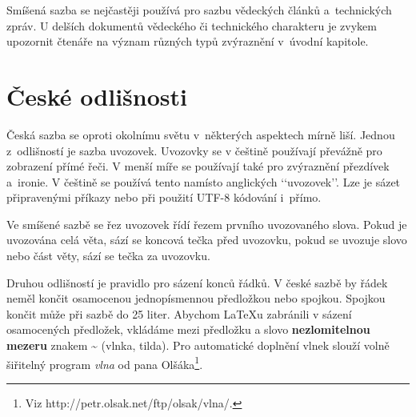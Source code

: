 \documentclass[11pt,a4paper,twocolumn]{article}[25.02.2017]
\begin{document}
	Smíšená sazba se nejčastěji používá pro sazbu vědeckých článků a~technických zpráv. U delších dokumentů vědeckého či technického charakteru je zvykem upozornit čtenáře na význam různých typů zvýrazně\-ní v~úvodní kapitole.
	
	\section {České odlišnosti}
	
	Česká sazba se oproti okolnímu světu v~některých aspektech mírně liší. Jednou z~odlišností je sazba uvozovek. Uvozovky se v češtině používají převážně pro zobrazení přímé řeči. V menší míře se používají také pro zvýraznění přezdívek a~ironie. V češtině se používá tento \textbf{} namísto anglických ‘‘uvozovek’’. Lze je sázet připravenými příkazy nebo při použití UTF-8 kódování i~přímo.
	
	Ve smíšené sazbě se řez uvozovek řídí řezem prvního uvozovaného slova. Pokud je uvozována celá věta, sází se koncová tečka před uvozovku, pokud se uvozuje slovo nebo část věty, sází se tečka za uvozovku.
	
	Druhou odlišností je pravidlo pro sázení konců řádků. V české sazbě by řádek neměl končit osamocenou jednopísmennou předložkou nebo spojkou. Spojkou  končit může při sazbě do 25 liter. Abychom \LaTeX u zabránili v sázení osamocených předložek, vkládáme mezi předložku a slovo \textbf{nezlomitelnou mezeru} znakem \textasciitilde{} (vlnka, tilda). Pro automatické doplnění vlnek slouží volně šiřitelný program \emph{vlna} od pana Olšáka\footnote[1]{Viz http://petr.olsak.net/ftp/olsak/vlna/.}.
\end{document}

